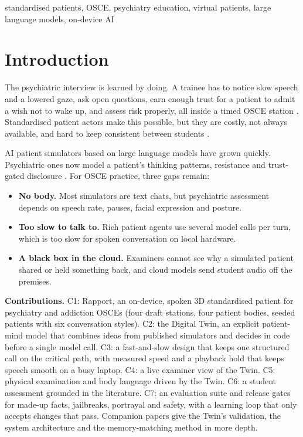 \documentclass[conference]{IEEEtran}
\begin{document}
\begin{IEEEkeywords}
standardised patients, OSCE, psychiatry education, virtual patients, large language models, on-device AI
\end{IEEEkeywords}

\section{Introduction}
The psychiatric interview is learned by doing. A trainee has to notice slow speech and a lowered gaze, ask open questions, earn enough trust for a
patient to admit a wish not to wake up, and assess risk properly, all inside a timed OSCE station \cite{harden1975osce}. Standardised patient actors
make this possible, but they are costly, not always available, and hard to keep consistent between students \cite{piot2021simulation}.

AI patient simulators based on large language models have grown quickly. Psychiatric ones now model a patient's thinking patterns, resistance and
trust-gated disclosure \cite{wang2024patient,lee2025psyche,sabour2026patientact}. For OSCE practice, three gaps remain:
\begin{itemize}
\item \textbf{No body.} Most simulators are text chats, but psychiatric assessment depends on speech rate, pauses, facial expression and posture.
\item \textbf{Too slow to talk to.} Rich patient agents use several model calls per turn, which is too slow for spoken conversation on local hardware.
\item \textbf{A black box in the cloud.} Examiners cannot see why a simulated patient shared or held something back, and cloud models send student
audio off the premises.
\end{itemize}

\textbf{Contributions.}
C1: Rapport, an on-device, spoken 3D standardised patient for psychiatry and addiction OSCEs (four draft stations, four patient bodies, seeded patients
with six conversation styles).
C2: the Digital Twin, an explicit patient-mind model that combines ideas from published simulators and decides in code before a single model call.
C3: a fast-and-slow design that keeps one structured call on the critical path, with measured speed and a playback hold that keeps speech smooth
on a busy laptop.
C4: a live examiner view of the Twin.
C5: physical examination and body language driven by the Twin.
C6: a student assessment grounded in the literature.
C7: an evaluation suite and release gates for made-up facts, jailbreaks, portrayal and safety, with a learning loop that only accepts changes that pass.
Companion papers give the Twin's validation, the system architecture and the memory-matching method in more depth.
\end{document}
